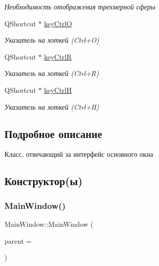 \begin{DoxyCompactItemize}
\begin{DoxyCompactList}\small\item\em Необходимость отображения трехмерной сферы \end{DoxyCompactList}\item 
\mbox{\label{class_main_window_ab28306eeee19c150f6f31c73ad514e8f}} 
Q\+Shortcut $\ast$ \mbox{\hyperlink{class_main_window_ab28306eeee19c150f6f31c73ad514e8f}{key\+CtrlO}}
\begin{DoxyCompactList}\small\item\em Указатель на хоткей (Ctrl+O) \end{DoxyCompactList}\item 
\mbox{\label{class_main_window_a52ba0febb7c2ba3fa20fe9fe70af0bd4}} 
Q\+Shortcut $\ast$ \mbox{\hyperlink{class_main_window_a52ba0febb7c2ba3fa20fe9fe70af0bd4}{key\+CtrlR}}
\begin{DoxyCompactList}\small\item\em Указатель на хоткей (Ctrl+R) \end{DoxyCompactList}\item 
\mbox{\label{class_main_window_a5ed40b9ddd96298e6688a360c227863a}} 
Q\+Shortcut $\ast$ \mbox{\hyperlink{class_main_window_a5ed40b9ddd96298e6688a360c227863a}{key\+CtrlH}}
\begin{DoxyCompactList}\small\item\em Указатель на хоткей (Ctrl+H) \end{DoxyCompactList}\end{DoxyCompactItemize}


\subsection{Подробное описание}
Класс, отвечающий за интерфейс основного окна 

\subsection{Конструктор(ы)}
\mbox{\label{class_main_window_a8b244be8b7b7db1b08de2a2acb9409db}} 
\subsubsection{\texorpdfstring{Main\+Window()}{MainWindow()}}
{\footnotesize\ttfamily Main\+Window\+::\+Main\+Window (\begin{DoxyParamCaption}\item[{Q\+Widget $\ast$}]{parent = {} }\end{DoxyParamCaption})\hspace{0.3cm}{\ttfamily [explicit]}}

